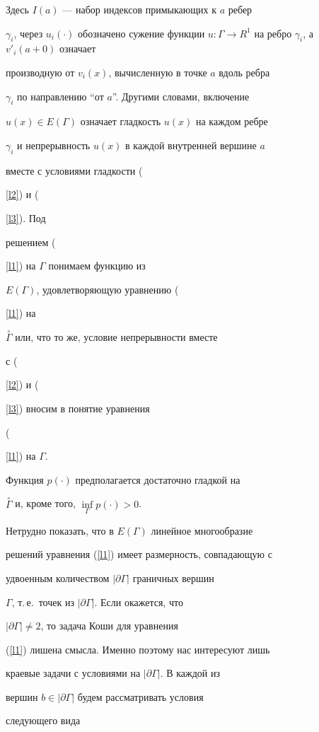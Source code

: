 Здесь $I(a)$ --- набор индексов примыкающих к $a$ ребер


$\gamma_i$, через $u_i(\cdot)$ обозначено сужение функции $u:


\Gamma \to R^1$ на ребро $\gamma_i$, а $v'_i(a+0)$ означает


производную от $v_i(x)$, вычисленную в точке $a$ вдоль ребра


$\gamma_i$ по направлению ``от $a$''. Другими словами, включение


$u(x)\in E(\Gamma)$ означает гладкость $u(x)$ на каждом ребре


$\gamma_i$ и непрерывность $u(x)$ в каждой внутренней вершине $a$


вместе с условиями гладкости ({\ref{l2}) и ({\ref{l3}). Под


решением ({\ref{l1}) на $\Gamma$ понимаем функцию из


$E(\Gamma)$, удовлетворяющую уравнению ({\ref{l1}) на


$\overset{\circ}{\Gamma}{}$ или, что то же, условие непрерывности вместе


с ({\ref{l2}) и ({\ref{l3}) вносим в понятие уравнения


({\ref{l1}) на $\Gamma$.





Функция $p(\cdot)$ предполагается достаточно гладкой на


$\overset{\circ}{\Gamma}$ и, кроме того, $\inf\limits_{\Gamma}p(\cdot)>0$.


Нетрудно показать, что в $E(\Gamma)$ линейное многообразие


решений уравнения (\ref{l1}) имеет размерность, совпадающую с


удвоенным количеством $|\partial \Gamma|$ граничных вершин


$\Gamma$, т.\,е.~точек из $|\partial \Gamma|$. Если окажется, что


$|\partial \Gamma|\ne 2$, то задача Коши для уравнения


(\ref{l1}) лишена смысла. Именно поэтому нас интересуют лишь


краевые задачи с условиями на $|\partial \Gamma|$. В каждой из


вершин $b \in |\partial \Gamma|$ будем рассматривать условия


следующего вида


\begin{equation}


\label{l4}



\end{equation}}}}}}}}
